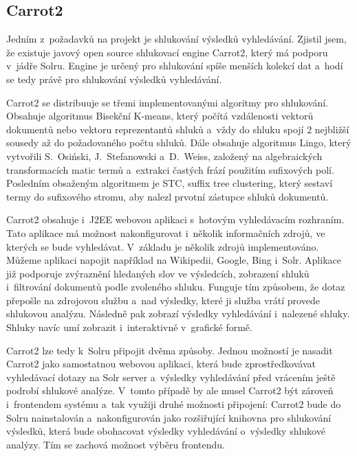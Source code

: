 \subsection{Carrot2}
Jedním z~požadavků na projekt je shlukování výsledků vyhledávání. Zjistil jsem, že existuje javový open source shlukovací engine Carrot2\cite{carrot2:manual}, který má podporu v~jádře Solru. Engine je určený pro shlukování spíše menších kolekcí dat a~hodí se tedy právě pro shlukování výsledků vyhledávání.

Carrot2 se distribuuje se třemi implementovanými algoritmy pro shlukování. Obsahuje algoritmus Bisekční K-means, který počítá vzdálenosti vektorů dokumentů nebo vektoru reprezentantů shluků a~vždy do shluku spojí 2 nejbližší sousedy až do požadovaného počtu shluků. Dále obsahuje algoritmus Lingo, který vytvořili S.~Osiński, J.~Stefanowski a~D.~Weiss, založený na algebraických transformacích matic termů a~extrakci častých frází použitím sufixových polí. Posledním obsaženým algoritmem je STC, suffix tree clustering, který sestaví termy do sufixového stromu, aby nalezl prvotní zástupce shluků dokumentů.

Carrot2 obsahuje i~J2EE webovou aplikaci s~hotovým vyhledávacím rozhraním. Tato aplikace má možnost nakonfigurovat i~několik informačních zdrojů, ve kterých se bude vyhledávat. V~základu je několik zdrojů implementováno. Můžeme aplikaci napojit například na Wikipedii, Google, Bing i~Solr. Aplikace již podporuje zvýraznění hledaných slov ve výsledcích, zobrazení shluků i~filtrování dokumentů podle zvoleného shluku. Funguje tím způsobem, že dotaz přepošle na zdrojovou službu a~nad výsledky, které ji služba vrátí provede shlukovou analýzu. Následně pak zobrazí výsledky vyhledávání i~nalezené shluky. Shluky navíc umí zobrazit i~interaktivně v~grafické formě.

Carrot2 lze tedy k~Solru připojit dvěma způsoby. Jednou možností je nasadit Carrot2 jako samostatnou webovou aplikaci, která bude zprostředkovávat vyhledávací dotazy na Solr server a~výsledky vyhledávání před vrácením ještě podrobí shlukové analýze. V~tomto případě by ale musel Carrot2 být zároveň i~frontendem systému a~tak využiji druhé možnosti připojení: Carrot2 bude do Solru nainstalován a~nakonfigurován jako rozšiřující knihovna pro shlukování výsledků, která bude obohacovat výsledky vyhledávání o~výsledky shlukové analýzy. Tím se zachová možnost výběru frontendu.